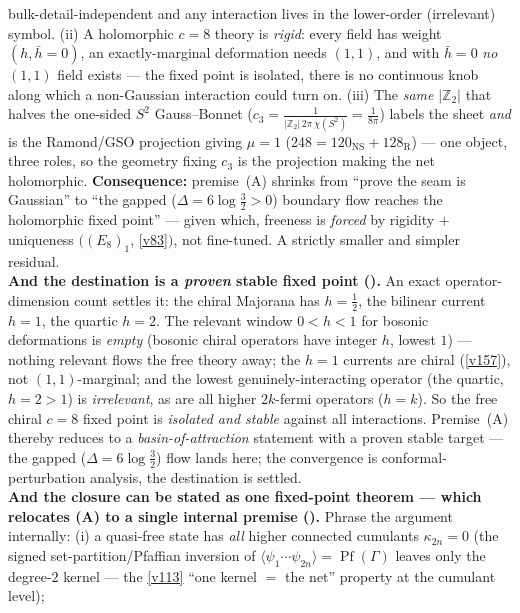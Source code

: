 \documentclass[11pt,a4paper]{article}
\newcommand{\cthree}{c_3}
\newcommand{\Z}{\mathbb Z}
\begin{document}
\begin{keybox}
bulk-detail-independent and any interaction lives in the lower-order (irrelevant) symbol. (ii) A holomorphic
$c{=}8$ theory is \emph{rigid}: every field has weight $(h,\bar h{=}0)$, an exactly-marginal deformation
needs $(1,1)$, and with $\bar h{=}0$ \emph{no} $(1,1)$ field exists --- the fixed point is isolated, there is
no continuous knob along which a non-Gaussian interaction could turn on. (iii) The \emph{same} $|\Z_2|$ that
halves the one-sided $S^2$ Gauss--Bonnet ($\cthree=\tfrac1{|\Z_2|\,2\pi\,\chi(S^2)}=\tfrac1{8\pi}$) labels
the sheet \emph{and} is the Ramond/GSO projection giving $\mu{=}1$ ($248{=}120_{\mathrm{NS}}{+}128_{\mathrm
R}$) --- one object, three roles, so the geometry fixing $\cthree$ is the projection making the net
holomorphic. \textbf{Consequence:} premise~(A) shrinks from ``prove the seam is Gaussian'' to ``the gapped
($\Delta{=}6\log\tfrac32{>}0$) boundary flow reaches the holomorphic fixed point'' --- given which, freeness
is \emph{forced} by rigidity $+$ uniqueness $((E_8)_1$, \vref{v83}$)$, not fine-tuned. A strictly smaller and
simpler residual.
\smallskip\\
\noindent\textbf{And the destination is a \emph{proven} stable fixed point ().}
An exact operator-dimension count settles it: the chiral Majorana has $h{=}\tfrac12$, the bilinear current
$h{=}1$, the quartic $h{=}2$. The relevant window $0<h<1$ for bosonic deformations is \emph{empty} (bosonic
chiral operators have integer $h$, lowest $1$) --- nothing relevant flows the free theory away; the $h{=}1$
currents are chiral (\vref{v157}), not $(1,1)$-marginal; and the lowest genuinely-interacting operator (the
quartic, $h{=}2{>}1$) is \emph{irrelevant}, as are all higher $2k$-fermi operators ($h{=}k$). So the free
chiral $c{=}8$ fixed point is \emph{isolated and stable} against all interactions. Premise~(A) thereby
reduces to a \emph{basin-of-attraction} statement with a proven stable target --- the gapped
($\Delta{=}6\log\tfrac32$) flow lands here; the convergence is conformal-perturbation analysis, the
destination is settled.
\smallskip\\
\noindent\textbf{And the closure can be stated as one fixed-point theorem --- which relocates (A) to a
single internal premise ().} Phrase the argument internally:
(i) a quasi-free state has \emph{all} higher connected cumulants $\kappa_{2n}{=}0$ (the signed
set-partition/Pfaffian inversion of $\langle\psi_1\cdots\psi_{2n}\rangle=\operatorname{Pf}(\Gamma)$ leaves
only the degree-$2$ kernel --- the \vref{v113} ``one kernel $=$ the net'' property at the cumulant level);

\end{keybox}
\end{document}
